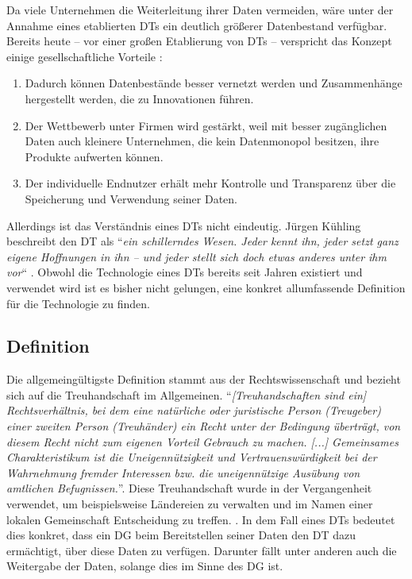 \documentclass[
	fontsize=11pt,
	headings=small,
	parskip=half,           %
	bibliography=totoc,
	numbers=noenddot,       %
	open=any,               %
]{scrreprt}
\begin{document}
Da viele Unternehmen die Weiterleitung ihrer Daten vermeiden, wäre unter der Annahme eines etablierten DTs ein deutlich größerer Datenbestand verfügbar. Bereits heute -- vor einer großen Etablierung von DTs -- verspricht das Konzept  einige gesellschaftliche Vorteile \cite{dt-richter2020ddvtalk}: 
\begin{enumerate}
    \item Dadurch können Datenbestände besser vernetzt werden und Zusammenhänge hergestellt werden, die zu Innovationen führen.
    \item Der Wettbewerb unter Firmen wird gestärkt, weil mit besser zugänglichen Daten auch kleinere Unternehmen, die kein Datenmonopol besitzen, ihre Produkte aufwerten können.
    \item Der individuelle Endnutzer erhält mehr Kontrolle und Transparenz über die Speicherung und Verwendung seiner Daten.
\end{enumerate}

Allerdings ist das Verständnis eines DTs nicht eindeutig. Jürgen Kühling beschreibt den DT als ``\textit{ein schillerndes Wesen. Jeder kennt ihn, jeder setzt ganz eigene Hoffnungen in ihn – und jeder stellt sich doch etwas anderes unter ihm vor}`` \cite{dt-kuhling2021datentreuhander}. Obwohl die Technologie eines DTs bereits seit Jahren existiert und verwendet wird \cite{dt-hardinges2018data} ist es bisher nicht gelungen, eine konkret allumfassende Definition für die Technologie zu finden.

\subsection{Definition}
Die allgemeingültigste Definition stammt aus der Rechtswissenschaft und bezieht sich auf die Treuhandschaft im Allgemeinen. ``\textit{[Treuhandschaften sind ein] Rechtsverhältnis, bei dem eine natürliche oder juristische Person (Treugeber) einer zweiten Person (Treuhänder) ein Recht unter der Bedingung überträgt, von diesem Recht nicht zum eigenen Vorteil Gebrauch zu machen. [...] Gemeinsames Charakteristikum ist die Uneigennützigkeit und Vertrauenswürdigkeit bei der Wahrnehmung fremder Interessen bzw. die uneigennützige Ausübung von amtlichen Befugnissen.}''\cite{dt-beeck2013treuhandschaft}. Diese Treuhandschaft wurde in der Vergangenheit verwendet, um beispielsweise Ländereien zu verwalten und im Namen einer lokalen Gemeinschaft Entscheidung zu treffen. \cite{dt-hardinges2018data}. In dem Fall eines DTs bedeutet dies konkret, dass ein DG beim Bereitstellen seiner Daten den DT dazu ermächtigt, über diese Daten zu verfügen. Darunter fällt unter anderen auch die Weitergabe der Daten, solange dies im Sinne des DG ist. 
\end{document}
